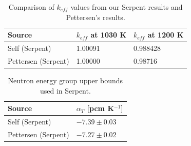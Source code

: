 \documentclass{anstrans}
\begin{document}
%
\begin{table}[h!]
\centering
\begin{tabular}{lll}
\hline
{Source} & {$k_{eff}$ at 1030 K} & $k_{eff}$ at 1200 K\\
\hline
Self (Serpent) & 1.00091 & 0.988428\\
Pettersen (Serpent) & 1.00000 & 0.98716\\
\hline
\end{tabular}
\captionsetup{justification=centering}
\caption{Comparison of $k_{eff}$ values from our Serpent results and Pettersen's results.}
\label{table:keffcomp}
\end{table}
%
\begin{table}[h!]
\centering
\begin{tabular}{ll}
\hline
{Source} & {$\alpha_T$ [pcm K$^{-1}$]}\\
\hline
Self (Serpent) & $-7.39 \pm 0.03$\\
Pettersen (Serpent) & $-7.27 \pm 0.02$\\
\hline
\end{tabular}
\captionsetup{justification=centering}
\caption{Neutron energy group upper bounds used in Serpent.}
\label{table:reactivity}
\end{table}
%



\end{document}

